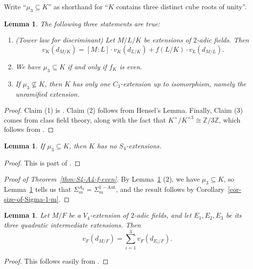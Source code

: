 \documentclass[11pt]{amsart}
\theoremstyle{theorem}
\newtheorem{lemma}[theorem]{Lemma}
\theoremstyle{example}
\theoremstyle{definition}
\numberwithin{theorem}{section}
\numberwithin{theorem}{section}
\newcommand{\Z}{\mathbb{Z}}
\newcommand{\oneaut}{\mathrm{1-Aut}}
\begin{document}
Write ``$\mu_3\subseteq K$'' as shorthand for ``$K$ contains three distinct cube roots of unity''.
\begin{lemma}
    \label{lem-A4-vs-S4-basic-facts}
    The following three statements are true: 
    \begin{enumerate}
        \item (Tower law for discriminant) Let $M/L/K$ be extensions of $2$-adic fields. Then 
        $$
        v_K(d_{M/K}) = [M : L] \cdot v_K(d_{L/K}) + f(L/K)\cdot v_L(d_{M/L}). 
        $$
        \item We have $\mu_3\subseteq K$ if and only if $f_K$ is even. 
        \item If $\mu_3\not\subseteq K$, then $K$ has only one $C_3$-extension up to isomorphism, namely the unramified extension. 
    \end{enumerate}
\end{lemma}
\begin{proof}
    Claim (1) is \cite[Proposition III.8]{greenberg1995local}. Claim (2) follows from Hensel's Lemma. Finally, Claim (3) comes from class field theory, along with the fact that $K^\times / K^{\times 3} \cong \Z/3\Z$, which follows from \cite[Proposition~3.7]{neukirch-bonn}. 
\end{proof}
\begin{lemma}
    \label{lem-mu3-no-S4}
    If $\mu_3\subseteq K$, then $K$ has no $S_4$-extensions. 
\end{lemma}
\begin{proof}
    This is part of \cite[Theorem~1.2]{wei-ji}.
\end{proof}
\begin{proof}[Proof of Theorem~\ref{thm-S4-A4-f-even}]
    By Lemma~\ref{lem-A4-vs-S4-basic-facts} (2), we have $\mu_3 \subseteq K$, so Lemma~\ref{lem-mu3-no-S4} tells us that $\Sigma^{A_4}_m = \Sigma^{\oneaut}_m$, and the result follows by Corollary~\ref{cor-size-of-Sigma-1-m}. 
\end{proof}

\begin{lemma}
    \label{lem-disc-of-V4-in-terms-of-quad-exts}
    Let $M/F$ be a $V_4$-extension of $2$-adic fields, and let $E_1,E_2,E_3$ be its three quadratic intermediate extensions. Then 
    $$
    v_F(d_{M/F}) = \sum_{i=1}^3 v_F(d_{E_i/F}). 
    $$
\end{lemma}
\begin{proof}
    This follows easily from \cite[Theorem~17.50]{keune-nf}. 
\end{proof}
\end{document}
